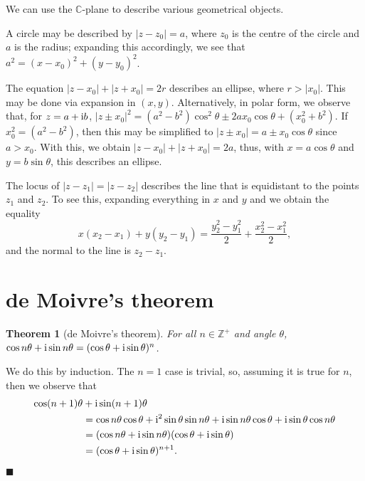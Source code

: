 \documentclass[letter-paper]{tufte-book}
\newtheorem{theorem}{\color{pastel-blue}Theorem}[section]
\newenvironment{proof}[1][Proof]{\begin{trivlist}
\item[\hskip \labelsep {\bfseries #1}]}{\end{trivlist}}
\newenvironment{example}[1][Example]{\begin{trivlist}
\item[\hskip \labelsep {\bfseries #1}]}{\end{trivlist}}
\newcommand{\zi}{{\rm i}}
\newcommand{\qed}{\hfill$\blacksquare$}
\begin{document}
We can use the $\mathbb{C}$-plane to describe various geometrical objects.
\begin{example}
	A circle may be described by $|z-z_0|=a$, where $z_0$ is the centre of the
	circle and $a$ is the radius; expanding this accordingly, we see that $a^2 =
	(x-x_0)^2 + (y-y_0)^2$.
\end{example}
\begin{example}
	The equation $|z-x_0|+|z+x_0|=2r$ describes an ellipse, where $r>|x_0|$.
	This may be done via expansion in $(x,y)$. Alternatively, in polar form, we
	observe that, for $z=a+\zi b$, $|z\pm x_0|^2 = (a^2-b^2)\cos^2\theta\pm
	2ax_0\cos\theta + (x_0^2+b^2)$. If $x_0^2=(a^2-b^2)$, then this may be
	simplified to $|z\pm x_0|=a\pm x_0\cos\theta$ since $a>x_0$. With this, we
	obtain $|z-x_0|+|z+x_0|=2a$, thus, with $x=a\cos\theta$ and $y=b\sin\theta$,
	this describes an ellipse.
\end{example}
\begin{example}
	The locus of $|z-z_1|=|z-z_2|$ describes the line that is equidistant to the
	points $z_1$ and $z_2$. To see this, expanding everything in $x$ and $y$ and
	we obtain the equality
	\begin{equation*}
		x(x_2-x_1) + y(y_2-y_1) 
		= \frac{y_2^2-y_1^2}{2} + \frac{x_2^2 - x_1^2}{2},
	\end{equation*}
	and the normal to the line is $z_2-z_1$.
\end{example}


\section{de Moivre's theorem}

\begin{theorem}[de Moivre's theorem]
	For all $n\in\mathbb{Z}^+$ and angle $\theta$, $\cos n\theta+\zi \sin
	n\theta = (\cos\theta+\zi\sin\theta)^n$.
\end{theorem}
\begin{proof}
	We do this by induction. The $n=1$ case is trivial, so, assuming it is true
	for $n$, then we observe that
	\begin{align*}
		\cos(n+1)\theta&+\zi\sin(n+1)\theta \\
		&=\cos n\theta\cos\theta + \zi^2 \sin\theta\sin n\theta
		+\zi\sin n\theta\cos\theta + \zi\sin\theta\cos n\theta\\
		&= (\cos n\theta+\zi\sin n\theta)(\cos\theta+\zi\sin\theta)\\
		&=(\cos\theta+\zi\sin\theta)^{n+1}.
	\end{align*}
	\qed
\end{proof}
\end{document}
